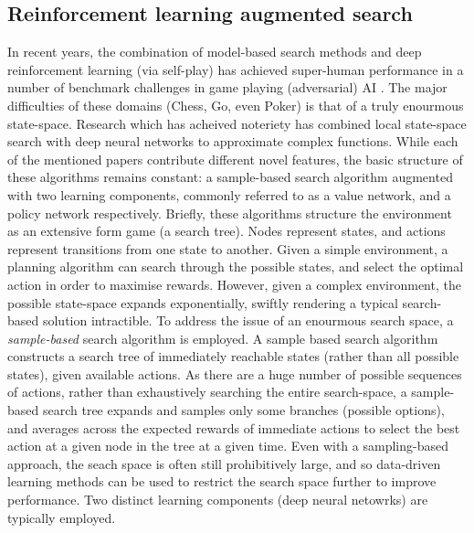 \subsection{Reinforcement learning augmented search} \label{RL + Search}
In recent years, the combination of model-based search methods and deep reinforcement learning (via self-play) has achieved super-human performance in a number of benchmark challenges in game playing (adversarial) AI \cite{AlphaGo,Brown2020,Lerer2019}. 
The major difficulties of these domains (Chess, Go, even Poker) is that of a truly enourmous state-space. Research which has acheived noteriety has combined local state-space search with deep neural networks to approximate complex functions. 
\newline \newline
While each of the mentioned papers contribute different novel features, the basic structure of these algorithms remains constant: a sample-based search algorithm augmented with two learning components, commonly referred to as a value network, and a policy network respectively.
\newline \newline
Briefly, these algorithms structure the environment as an extensive form game (a search tree). Nodes represent states, and actions represent transitions from one state to another. Given a simple environment, a planning algorithm can search through the possible states, and select the optimal action in order to maximise rewards. However, given a complex environment, the possible state-space expands exponentially, swiftly rendering a typical search-based solution intractible. To address the issue of an enourmous search space, a \textit{sample-based} search algorithm is employed. 
\newline \newline
A sample based search algorithm constructs a search tree of immediately reachable states (rather than all possible states), given available actions. As there are a huge number of possible sequences of actions, rather than exhaustively searching the entire search-space, a sample-based search tree expands and samples only some branches (possible options), and averages across the expected rewards of immediate actions to select the best action at a given node in the tree at a given time.
\newline \newline
Even with a sampling-based approach, the seach space is often still prohibitively large, and so data-driven learning methods can be used to restrict the search space further to improve performance. Two distinct learning components (deep neural netowrks) are typically employed.  
